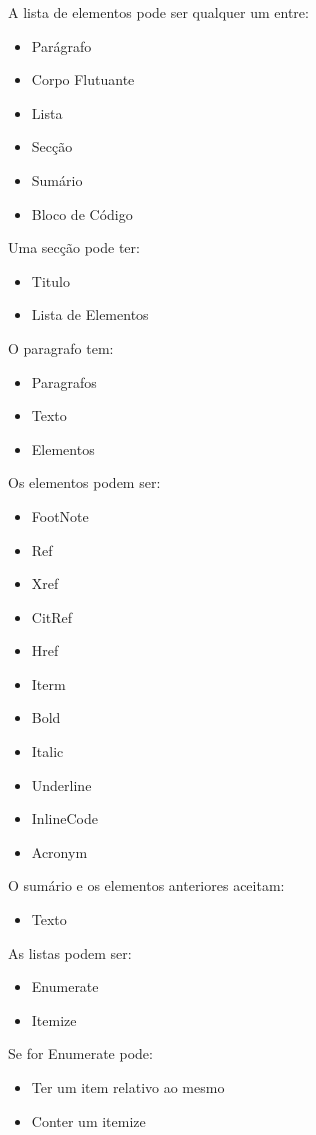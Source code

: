 \documentclass[11pt, a4paper]{report}
\begin{document}
A lista de elementos pode ser qualquer um entre:\\
\begin{itemize}
\item Parágrafo
\item Corpo Flutuante
\item Lista
\item Secção
\item Sumário
\item Bloco de Código
\end{itemize}
Uma secção pode ter:\\
\begin{itemize}
\item Titulo
\item Lista de Elementos
\end{itemize}
O paragrafo tem:\\
\begin{itemize}
\item Paragrafos
\item Texto
\item Elementos
\end{itemize}
Os elementos podem ser:\\
\begin{itemize}
\item FootNote
\item Ref
\item Xref
\item CitRef
\item Href
\item Iterm
\item Bold
\item Italic
\item Underline
\item InlineCode
\item Acronym
\end{itemize}
O sumário e os elementos anteriores aceitam:\\
\begin{itemize}
\item Texto
\end{itemize}
As listas podem ser:\\
\begin{itemize}
\item Enumerate
\item Itemize
\end{itemize}
Se for Enumerate pode:\\
\begin{itemize}
\item Ter um item relativo ao mesmo
\item Conter um itemize
\end{itemize}
\end{document}
